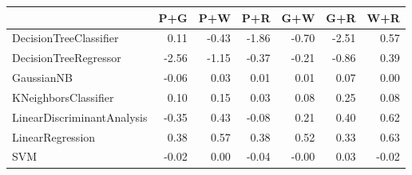 \begin{tabular}{lrrrrrr}
\toprule
{} &   P+G &   P+W &   P+R &   G+W &   G+R &   W+R \\
\midrule
DecisionTreeClassifier     &  0.11 & -0.43 & -1.86 & -0.70 & -2.51 &  0.57 \\
DecisionTreeRegressor      & -2.56 & -1.15 & -0.37 & -0.21 & -0.86 &  0.39 \\
GaussianNB                 & -0.06 &  0.03 &  0.01 &  0.01 &  0.07 &  0.00 \\
KNeighborsClassifier       &  0.10 &  0.15 &  0.03 &  0.08 &  0.25 &  0.08 \\
LinearDiscriminantAnalysis & -0.35 &  0.43 & -0.08 &  0.21 &  0.40 &  0.62 \\
LinearRegression           &  0.38 &  0.57 &  0.38 &  0.52 &  0.33 &  0.63 \\
SVM                        & -0.02 &  0.00 & -0.04 & -0.00 &  0.03 & -0.02 \\
\bottomrule
\end{tabular}
